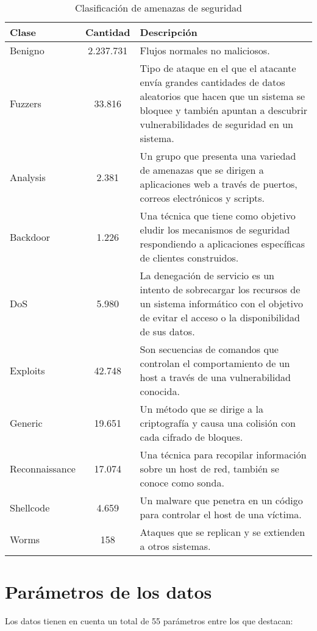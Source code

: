 \begin{table}[H]
\label{tab:attacks-tab}
\begin{tabular}{|l|c|>{\RaggedRight}p{10cm}|} %
\hline
\rowcolor[HTML]{C0C0C0} 
\textbf{Clase} & \textbf{Cantidad} & \textbf{Descripción} \\ \hline
Benigno & 2.237.731 & Flujos normales no maliciosos. \\ \hline
Fuzzers & 33.816 & Tipo de ataque en el que el atacante envía grandes cantidades de datos aleatorios que hacen que un sistema se bloquee y también apuntan a descubrir vulnerabilidades de seguridad en un sistema. \\ \hline
Analysis & 2.381 & Un grupo que presenta una variedad de amenazas que se dirigen a aplicaciones web a través de puertos, correos electrónicos y scripts. \\ \hline
Backdoor & 1.226 & Una técnica que tiene como objetivo eludir los mecanismos de seguridad respondiendo a aplicaciones específicas de clientes construidos. \\ \hline
DoS & 5.980 & La denegación de servicio es un intento de sobrecargar los recursos de un sistema informático con el objetivo de evitar el acceso o la disponibilidad de sus datos. \\ \hline
Exploits & 42.748 & Son secuencias de comandos que controlan el comportamiento de un host a través de una vulnerabilidad conocida. \\ \hline
Generic & 19.651 & Un método que se dirige a la criptografía y causa una colisión con cada cifrado de bloques. \\ \hline
Reconnaissance & 17.074 & Una técnica para recopilar información sobre un host de red, también se conoce como sonda. \\ \hline
Shellcode & 4.659 & Un malware que penetra en un código para controlar el host de una víctima. \\ \hline
Worms & 158 & Ataques que se replican y se extienden a otros sistemas. \\ \hline
\end{tabular}
\centering
\caption{Clasificación de amenazas de seguridad}
\end{table}

\section{Parámetros de los datos} \label{sec.param-datos}

Los datos tienen en cuenta un total de 55 parámetros entre los que destacan:


